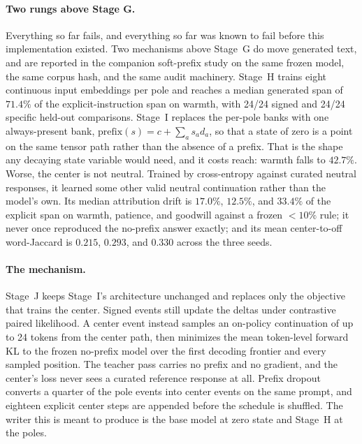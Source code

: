 \documentclass[10pt]{article}
\begin{document}
\paragraph{Two rungs above Stage G.} Everything so far fails, and everything so
far was known to fail before this implementation existed. Two mechanisms above
Stage~G do move generated text, and are reported in the companion soft-prefix
study \cite{penov2026prefix} on the same frozen model, the same corpus hash, and
the same audit machinery. Stage~H trains eight continuous input embeddings per
pole and reaches a median generated span of $71.4\%$ of the explicit-instruction
span on warmth, with 24/24 signed and 24/24 specific held-out comparisons.
Stage~I replaces the per-pole banks with one always-present bank,
$\mathrm{prefix}(s) = c + \sum_a s_a d_a$, so that a state of zero is a point on
the same tensor path rather than the absence of a prefix. That is the shape any
decaying state variable would need, and it costs reach: warmth falls to
$42.7\%$. Worse, the center is not neutral. Trained by cross-entropy against
curated neutral responses, it learned some other valid neutral continuation
rather than the model's own. Its median attribution drift is $17.0\%$, $12.5\%$,
and $33.4\%$ of the explicit span on warmth, patience, and goodwill against a
frozen $<10\%$ rule; it never once reproduced the no-prefix answer exactly; and
its mean center-to-off word-Jaccard is $0.215$, $0.293$, and $0.330$ across the
three seeds.

\paragraph{The mechanism.} Stage~J keeps Stage~I's architecture unchanged and
replaces only the objective that trains the center. Signed events still update
the deltas under contrastive paired likelihood. A center event instead samples
an on-policy continuation of up to 24 tokens from the center path, then
minimizes the mean token-level forward KL to the frozen no-prefix model over the
first decoding frontier and every sampled position. The teacher pass carries no
prefix and no gradient, and the center's loss never sees a curated reference
response at all. Prefix dropout converts a quarter of the pole events into
center events on the same prompt, and eighteen explicit center steps are
appended before the schedule is shuffled. The writer this is meant to produce is
the base model at zero state and Stage~H at the poles.
\end{document}
